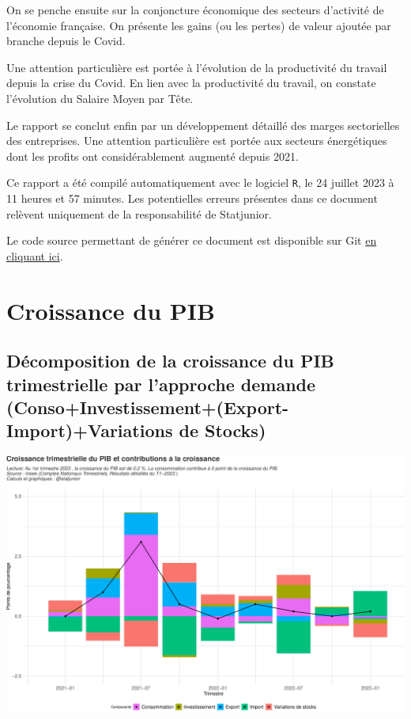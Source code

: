 \documentclass[
  paper=a4,
  ,captions=tableheading
]{scrartcl}
\begin{document}
On se penche ensuite sur la conjoncture économique des secteurs
d'activité de l'économie française. On présente les gains (ou les
pertes) de valeur ajoutée par branche depuis le Covid.

Une attention particulière est portée à l'évolution de la productivité
du travail depuis la crise du Covid. En lien avec la productivité du
travail, on constate l'évolution du Salaire Moyen par Tête.

Le rapport se conclut enfin par un développement détaillé des marges
sectorielles des entreprises. Une attention particulière est portée aux
secteurs énergétiques dont les profits ont considérablement augmenté
depuis 2021.

Ce rapport a été compilé automatiquement avec le logiciel \texttt{R}, le
24 juillet 2023 à 11 heures et 57 minutes. Les potentielles erreurs
présentes dans ce document relèvent uniquement de la responsabilité de
Statjunior.

Le code source permettant de générer ce document est disponible sur Git
\href{https://github.com/statjunior/Statjunior/tree/main/Conjoncture\%20-\%20comptes\%20trimestriels/}{en
cliquant ici}.

\newpage

\hypertarget{croissance-du-pib}{%
\section{Croissance du PIB}\label{croissance-du-pib}}

\hypertarget{duxe9composition-de-la-croissance-du-pib-trimestrielle-par-lapproche-demande-consoinvestissementexport-importvariations-de-stocks}{%
\subsection{Décomposition de la croissance du PIB trimestrielle par
l'approche demande (Conso+Investissement+(Export-Import)+Variations de
Stocks)}\label{duxe9composition-de-la-croissance-du-pib-trimestrielle-par-lapproche-demande-consoinvestissementexport-importvariations-de-stocks}}

\includegraphics{rapport_pdf_compte_branche_files/figure-latex/unnamed-chunk-2-1.pdf}
\end{document}
